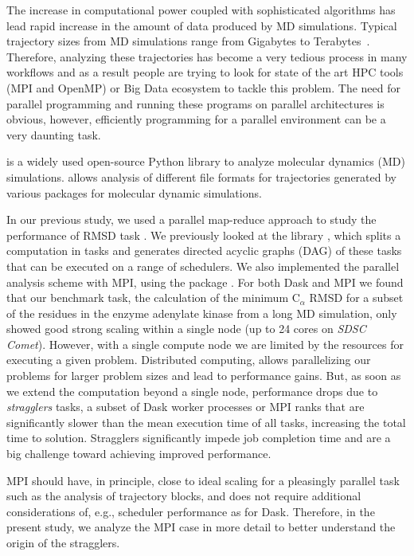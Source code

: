 \label{sec:introduction}
The increase in computational power coupled with sophisticated algorithms has lead rapid increase in the amount of data produced by MD simulations. 
Typical trajectory sizes from MD simulations range from Gigabytes to Terabytes~\cite{Cheatham:2015}.
Therefore, analyzing these trajectories has become a very tedious process in many workflows and as a result people are trying to look for state of the art HPC tools (MPI and OpenMP) or Big Data ecosystem to tackle this problem.
The need for parallel programming and running these programs on parallel architectures is obvious, however, efficiently programming for a parallel environment can be a very daunting task. 

 \citep{Gowers:2016aa,Michaud-Agrawal:2011fu} is a widely used open-source Python library to analyze molecular dynamics (MD) simulations. 
 allows analysis of different file formats for trajectories generated by various packages for molecular dynamic simulations. 

In our previous study, we used a parallel map-reduce approach to study the performance of RMSD task \cite{Khoshlessan:2017ab}. 
We previously looked at the  library \cite{Rocklin:2015aa}, which splits a computation in tasks and generates directed acyclic graphs (DAG) of these tasks that can be executed on a range of schedulers. 
We also implemented the parallel analysis scheme with MPI, using the  package \cite{Dalcin:2011aa, Dalcin:2005aa}. 
For both Dask and MPI we found that our benchmark task, the calculation of the minimum C$_{\alpha}$ RMSD for a
subset of the residues in the enzyme adenylate kinase from a long MD simulation, only showed good strong scaling within a single node (up to 24 cores on \emph{SDSC Comet}).
However, with a single compute node we are limited by the resources for executing a given problem.
Distributed computing, allows parallelizing our problems for larger problem sizes and lead to performance gains.
But, as soon as we extend the computation beyond a single node, performance drops due to \emph{stragglers} tasks, a subset of Dask worker processes or MPI ranks that are significantly slower than the mean execution time of all tasks, increasing the total time to solution.
Stragglers significantly impede job completion time and are a big challenge toward achieving improved performance.

MPI should have, in principle, close to ideal scaling for a pleasingly parallel task such as the analysis of trajectory blocks, and does not require additional considerations of, e.g., scheduler performance as for Dask. 
Therefore, in the present study, we analyze the MPI case in more detail to better understand the origin of the stragglers.

